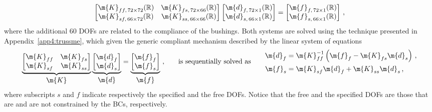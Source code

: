 \begin{equation}
  \begin{bmatrix}
    \m{K}_{ff ,\, 72 \times 72}(\mathbb{R}) & \m{K}_{fs ,\, 72 \times 66}(\mathbb{R}) \\
    \m{K}_{sf ,\, 66 \times 72}(\mathbb{R}) & \m{K}_{ss ,\, 66 \times 66}(\mathbb{R})
  \end{bmatrix} \begin{bmatrix}
    \m{d}_{f ,\, 72 \times 1}(\mathbb{R}) \\ \m{d}_{s ,\, 66 \times 1}(\mathbb{R})
  \end{bmatrix} = \begin{bmatrix}
    \m{f}_{f ,\, 72 \times 1}(\mathbb{R}) \\ \m{f}_{s ,\, 66 \times 1}(\mathbb{R})
  \end{bmatrix}
  \, \text{,}
\end{equation}
%
where the additional 60 \acp{DOF} are related to the compliance of the bushings. Both systems are solved using the technique presented in Appendix~\ref{app4:trussme}, which given the generic compliant mechanism described by the linear system of equations
%
\begin{equation}
  \label{chap5:eq:macrofe}
  \underbrace{\begin{bmatrix}
    \m{K}_{ff} & \m{K}_{fs} \\
    \m{K}_{sf} & \m{K}_{ss}
  \end{bmatrix}}_{\textstyle\m{K}} \underbrace{\begin{bmatrix}
    \m{d}_{f} \\ \m{d}_{s}
  \end{bmatrix}}_{\textstyle\m{d}} = \underbrace{\begin{bmatrix}
    \m{f}_{f} \\ \m{f}_{s}
  \end{bmatrix}}_{\textstyle\m{f}} \, \text{,}
  \qquad \text{is sequentially solved as} \qquad
  \begin{aligned}
    \m{d}_{f} &= \m{K}_{ff}^{-1}\left(\m{f}_{f} - \m{K}_{fs}\m{d}_{s}\right) \, \text{,} \\
    \m{f}_{s} &= \m{K}_{sf}\m{d}_{f} + \m{K}_{ss}\m{d}_{s} \, \text{,}
  \end{aligned}
\end{equation}
%
where subscripts $s$ and $f$ indicate respectively the specified and the free \acp{DOF}. Notice that the free and the specified \acp{DOF} are those that are and are not constrained by the \acp{BC}, respectively.

